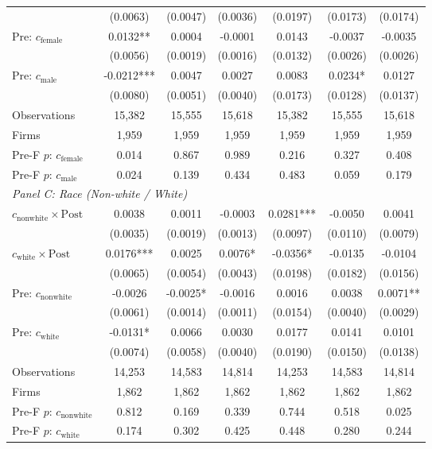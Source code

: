 \begin{table}[H]
{\begin{tabular}{lcccccc}
 & (0.0063) & (0.0047) & (0.0036) & (0.0197) & (0.0173) & (0.0174) \\
Pre: $c_{\text{female}}$ & 0.0132** & 0.0004 & -0.0001 & 0.0143 & -0.0037 & -0.0035 \\
 & (0.0056) & (0.0019) & (0.0016) & (0.0132) & (0.0026) & (0.0026) \\
Pre: $c_{\text{male}}$ & -0.0212*** & 0.0047 & 0.0027 & 0.0083 & 0.0234* & 0.0127 \\
 & (0.0080) & (0.0051) & (0.0040) & (0.0173) & (0.0128) & (0.0137) \\
\quad Observations & 15,382 & 15,555 & 15,618 & 15,382 & 15,555 & 15,618 \\
\quad Firms & 1,959 & 1,959 & 1,959 & 1,959 & 1,959 & 1,959 \\
\quad Pre-F $p$: $c_{\text{female}}$ & 0.014 & 0.867 & 0.989 & 0.216 & 0.327 & 0.408 \\
\quad Pre-F $p$: $c_{\text{male}}$ & 0.024 & 0.139 & 0.434 & 0.483 & 0.059 & 0.179  \\[6pt]
\multicolumn{7}{l}{\textit{Panel C: Race (Non-white / White)}} \\
$c_{\text{nonwhite}} \times \text{Post}$ & 0.0038 & 0.0011 & -0.0003 & 0.0281*** & -0.0050 & 0.0041 \\
 & (0.0035) & (0.0019) & (0.0013) & (0.0097) & (0.0110) & (0.0079) \\
$c_{\text{white}} \times \text{Post}$ & 0.0176*** & 0.0025 & 0.0076* & -0.0356* & -0.0135 & -0.0104 \\
 & (0.0065) & (0.0054) & (0.0043) & (0.0198) & (0.0182) & (0.0156) \\
Pre: $c_{\text{nonwhite}}$ & -0.0026 & -0.0025* & -0.0016 & 0.0016 & 0.0038 & 0.0071** \\
 & (0.0061) & (0.0014) & (0.0011) & (0.0154) & (0.0040) & (0.0029) \\
Pre: $c_{\text{white}}$ & -0.0131* & 0.0066 & 0.0030 & 0.0177 & 0.0141 & 0.0101 \\
 & (0.0074) & (0.0058) & (0.0040) & (0.0190) & (0.0150) & (0.0138) \\
\quad Observations & 14,253 & 14,583 & 14,814 & 14,253 & 14,583 & 14,814 \\
\quad Firms & 1,862 & 1,862 & 1,862 & 1,862 & 1,862 & 1,862 \\
\quad Pre-F $p$: $c_{\text{nonwhite}}$ & 0.812 & 0.169 & 0.339 & 0.744 & 0.518 & 0.025 \\
\quad Pre-F $p$: $c_{\text{white}}$ & 0.174 & 0.302 & 0.425 & 0.448 & 0.280 & 0.244  \\

\end{tabular}}
\end{table}
